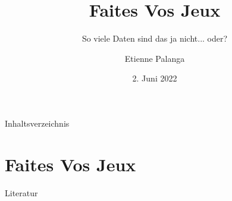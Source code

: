 \documentclass[aspectratio=169,10pt, notes]{beamer}
\title{Faites Vos Jeux}
\subtitle{So viele Daten sind das ja nicht... oder?}
\author{Etienne Palanga}
\date{2. Juni 2022}
\institute{TU Dortmund - Fakultät Informatik}
\begin{document}
\maketitle

\begin{frame}{Inhaltsverzeichnis}
    \tableofcontents
\end{frame}

\section{Faites Vos Jeux \cite{kees_faites_2017}}











\nocite{kees_faites_2017}
\nocite{lee_ethical_2016}
\nocite{zankl_international_2014}

\begin{frame}{Literatur}
\printbibliography[heading=none]
\end{frame}
\end{document}
